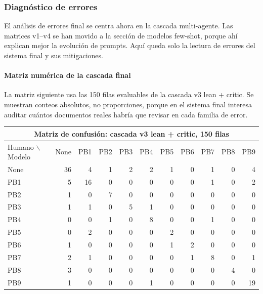
\subsubsection*{Diagnóstico de errores}

El análisis de errores final se centra ahora en la cascada multi-agente. Las matrices v1--v4 se han movido a la sección de modelos few-shot, porque ahí explican mejor la evolución de prompts. Aquí queda solo la lectura de errores del sistema final y sus mitigaciones.

\paragraph*{Matriz numérica de la cascada final}

La matriz siguiente usa las 150 filas evaluables de la cascada v3 lean + critic. Se muestran conteos absolutos, no proporciones, porque en el sistema final interesa auditar cuántos documentos reales habría que revisar en cada familia de error.

\begin{center}
\tiny
\setlength{\tabcolsep}{2.6pt}
\renewcommand{\arraystretch}{1.08}
\begin{tabular}{lrrrrrrrrrr}
\toprule
\multicolumn{11}{c}{\textbf{Matriz de confusión: cascada v3 lean + critic, 150 filas}} \\
\midrule
Humano $\backslash$ Modelo & None & PB1 & PB2 & PB3 & PB4 & PB5 & PB6 & PB7 & PB8 & PB9 \\
\midrule
None & 36 & 4 & 1 & 2 & 2 & 1 & 0 & 1 & 0 & 4 \\
PB1  & 5  & 16 & 0 & 0 & 0 & 0 & 0 & 1 & 0 & 2 \\
PB2  & 1  & 0 & 7 & 0 & 0 & 0 & 0 & 0 & 0 & 0 \\
PB3  & 1  & 1 & 0 & 5 & 1 & 0 & 0 & 0 & 0 & 0 \\
PB4  & 0  & 0 & 1 & 0 & 8 & 0 & 0 & 1 & 0 & 0 \\
PB5  & 0  & 2 & 0 & 0 & 0 & 2 & 0 & 0 & 0 & 0 \\
PB6  & 1  & 0 & 0 & 0 & 0 & 1 & 2 & 0 & 0 & 0 \\
PB7  & 2  & 1 & 0 & 0 & 0 & 0 & 1 & 8 & 0 & 1 \\
PB8  & 3  & 0 & 0 & 0 & 0 & 0 & 0 & 0 & 4 & 0 \\
PB9  & 1  & 0 & 0 & 0 & 1 & 0 & 0 & 0 & 0 & 19 \\
\bottomrule
\end{tabular}
\end{center}

